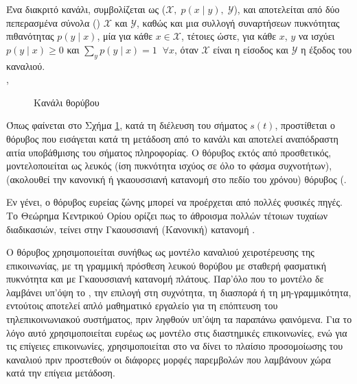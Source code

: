 \begin{definition}
Ένα διακριτό κανάλι, συμβολίζεται ως ($\mathcal{X},\;p(x\mid{y}),\;\mathcal{Y}$), και αποτελείται από δύο πεπερασμένα σύνολα () $\mathcal{X}$ και $\mathcal{Y}$, καθώς και μια συλλογή συναρτήσεων πυκνότητας πιθανότητας $p(y\mid{x})$, μία για κάθε $x\in\mathcal{X}$, τέτοιες ώστε, για κάθε $x$, $y$ να ισχύει $p(y\mid{x})\ge0$ και $\sum\nolimits_{y}p(y\mid{x})=1\;\;\forall{x}$, όταν $\mathcal{X}$ είναι η είσοδος και $\mathcal{Y}$ η έξοδος του καναλιού. \\
\cite{cover2012elements}, \cite{proakis1994communication}
\label{def:discrete channel}
\end{definition}

\begin{figure}[h]
\caption{Κανάλι  θορύβου}
\label{fig:awgn channel}
\end{figure}

Όπως φαίνεται στο Σχήμα \ref{fig:awgn channel}, κατά τη διέλευση του σήματος $s(t)$, προστίθεται ο θόρυβος που εισάγεται κατά τη μετάδοση από το κανάλι και αποτελεί αναπόδραστη αιτία υποβάθμισης του σήματος πληροφορίας. Ο θόρυβος εκτός από προσθετικός, μοντελοποιείται ως λευκός (ίση πυκνότητα ισχύος σε όλο το φάσμα συχνοτήτων),  (ακολουθεί την κανονική ή γκαουσσιανή κατανομή στο πεδίο του χρόνου) θόρυβος (.

Εν γένει, ο θόρυβος ευρείας ζώνης μπορεί να προέρχεται από πολλές φυσικές πηγές. Το Θεώρημα Κεντρικού Ορίου ορίζει πως το άθροισμα πολλών τέτοιων τυχαίων διαδικασιών, τείνει στην Γκαουσσιανή (Κανονική) κατανομή \cite{heyde2006central}.

Ο θόρυβος  χρησιμοποιείται συνήθως ως μοντέλο καναλιού χειροτέρευσης της επικοινωνίας, με τη γραμμική πρόσθεση λευκού θορύβου με σταθερή φασματική πυκνότητα και με Γκαουσσιανή κατανομή πλάτους. Παρ'όλο που το μοντέλο δε λαμβάνει υπ'όψη το , την επιλογή στη συχνότητα, τη διασπορά ή τη μη-γραμμικότητα, εντούτοις αποτελεί απλό μαθηματικό εργαλείο για τη επόπτευση του τηλεπικοινωνιακού συστήματος, πριν ληφθούν υπ'όψη τα παραπάνω φαινόμενα. Για το λόγο αυτό χρησιμοποιείται ευρέως ως μοντέλο στις διαστημικές επικοινωνίες, ενώ για τις επίγειες επικοινωνίες, χρησιμοποιείται στο να δίνει το πλαίσιο προσομοίωσης του καναλιού πριν προστεθούν οι διάφορες μορφές παρεμβολών που λαμβάνουν χώρα κατά την επίγεια μετάδοση.

